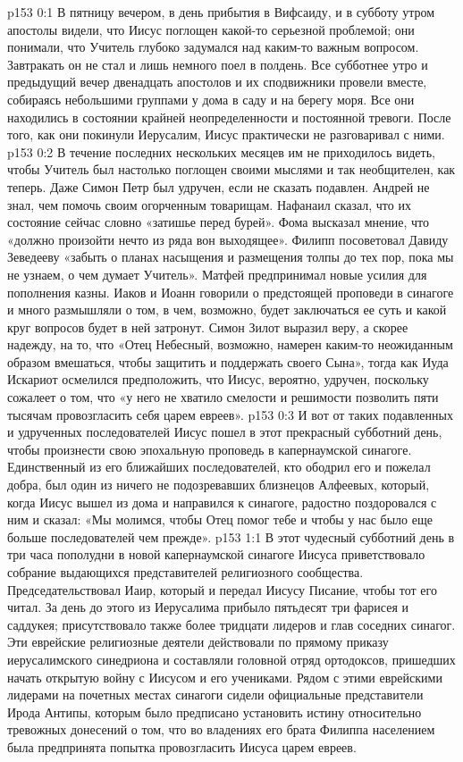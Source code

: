 \vs p153 0:1 В пятницу вечером, в день прибытия в Вифсаиду, и в субботу утром апостолы видели, что Иисус поглощен какой\hyp{}то серьезной проблемой; они понимали, что Учитель глубоко задумался над каким\hyp{}то важным вопросом. Завтракать он не стал и лишь немного поел в полдень. Все субботнее утро и предыдущий вечер двенадцать апостолов и их сподвижники провели вместе, собираясь небольшими группами у дома в саду и на берегу моря. Все они находились в состоянии крайней неопределенности и постоянной тревоги. После того, как они покинули Иерусалим, Иисус практически не разговаривал с ними.
\vs p153 0:2 В течение последних нескольких месяцев им не приходилось видеть, чтобы Учитель был настолько поглощен своими мыслями и так необщителен, как теперь. Даже Симон Петр был удручен, если не сказать подавлен. Андрей не знал, чем помочь своим огорченным товарищам. Нафанаил сказал, что их состояние сейчас словно «затишье перед бурей». Фома высказал мнение, что «должно произойти нечто из ряда вон выходящее». Филипп посоветовал Давиду Зеведееву «забыть о планах насыщения и размещения толпы до тех пор, пока мы не узнаем, о чем думает Учитель». Матфей предпринимал новые усилия для пополнения казны. Иаков и Иоанн говорили о предстоящей проповеди в синагоге и много размышляли о том, в чем, возможно, будет заключаться ее суть и какой круг вопросов будет в ней затронут. Симон Зилот выразил веру, а скорее надежду, на то, что «Отец Небесный, возможно, намерен каким\hyp{}то неожиданным образом вмешаться, чтобы защитить и поддержать своего Сына», тогда как Иуда Искариот осмелился предположить, что Иисус, вероятно, удручен, поскольку сожалеет о том, что «у него не хватило смелости и решимости позволить пяти тысячам провозгласить себя царем евреев».
\vs p153 0:3 И вот от таких подавленных и удрученных последователей Иисус пошел в этот прекрасный субботний день, чтобы произнести свою эпохальную проповедь в капернаумской синагоге. Единственный из его ближайших последователей, кто ободрил его и пожелал добра, был один из ничего не подозревавших близнецов Алфеевых, который, когда Иисус вышел из дома и направился к синагоге, радостно поздоровался с ним и сказал: «Мы молимся, чтобы Отец помог тебе и чтобы у нас было еще больше последователей чем прежде».
\vs p153 1:1 В этот чудесный субботний день в три часа пополудни в новой капернаумской синагоге Иисуса приветствовало собрание выдающихся представителей религиозного сообщества. Председательствовал Иаир, который и передал Иисусу Писание, чтобы тот его читал. За день до этого из Иерусалима прибыло пятьдесят три фарисея и саддукея; присутствовало также более тридцати лидеров и глав соседних синагог. Эти еврейские религиозные деятели действовали по прямому приказу иерусалимского синедриона и составляли головной отряд ортодоксов, пришедших начать открытую войну с Иисусом и его учениками. Рядом с этими еврейскими лидерами на почетных местах синагоги сидели официальные представители Ирода Антипы, которым было предписано установить истину относительно тревожных донесений о том, что во владениях его брата Филиппа населением была предпринята попытка провозгласить Иисуса царем евреев.
